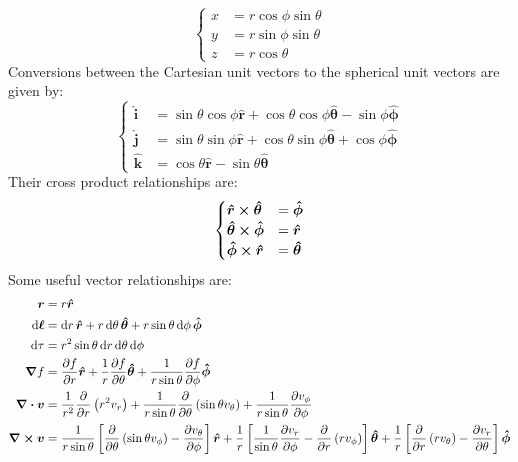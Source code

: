 \documentclass[oneside]{book}
\numberwithin{figure}{section}
\numberwithin{equation}{section}
\newcommand{\paren}[1]{\left(#1\right)}
\newcommand{\bhat}[1]{\bm{\hat{#1}}}
\theoremstyle{definition}
\begin{document}
	\begin{equation}
		\begin{cases}
			x &= r\cos\phi\sin\theta\\
			y &= r\sin\phi\sin\theta\\
			z &= r\cos\theta
		\end{cases}
	\end{equation}
	Conversions between the Cartesian unit vectors to the spherical unit vectors are given by:
	\begin{equation}
		\begin{cases}
			\bhat{i} &= \sin\theta\cos\phi\bhat{r} + \cos\theta\cos\phi\bhat{\theta} - \sin\phi\bhat{\phi}\\
			\bhat{j} &= \sin\theta\sin\phi\bhat{r} + \cos\theta\sin\phi\bhat{\theta} + \cos\phi\bhat{\phi}\\
			\bhat{k} &= \cos\theta\bhat{r} - \sin\theta\bhat{\theta}
		\end{cases}
	\end{equation}
	Their cross product relationships are:
	\begin{equation}
		\begin{cases}
			\bhat{r} \cross \bhat{\theta} &= \bhat{\phi}\\
			\bhat{\theta} \cross \bhat{\phi} &= \bhat{r}\\
			\bhat{\phi} \cross \bhat{r} &= \bhat{\theta}
		\end{cases}
	\end{equation}
	Some useful vector relationships are:
	\begin{align}
		\bm{r} &= r\bhat{r}\\
		\dd{\bm{\ell}} &= \dd{r}\bhat{r} + r\dd{\theta}\bhat{\theta} + r\sin\theta\dd{\phi}\bhat{\phi}\\
		\dd{\tau} &= r^2\sin\theta\dd{r}\dd{\theta}\dd{\phi}\\
		\grad{f} &= \pdv{f}{r}\bhat{r} + \dfrac{1}{r}\pdv{f}{\theta}\bhat{\theta} + \dfrac{1}{r\sin\theta}\pdv{f}{\phi}\bhat{\phi}\\
		\div{\bm{v}} &= \dfrac{1}{r^2}\pdv{r}\paren{r^2v_r} + \dfrac{1}{r\sin\theta}\pdv{\theta}\paren{\sin\theta v_\theta} + \dfrac{1}{r\sin\theta}\pdv{v_\phi}{\phi}\\
		\curl{\bm{v}} &= \dfrac{1}{r\sin\theta}\left[\pdv{\theta}\paren{\sin\theta v_\phi} - \pdv{v_\theta}{\phi}\right]\bhat{r} + \dfrac{1}{r}\left[\dfrac{1}{\sin\theta}\pdv{v_r}{\phi} - \pdv{r}\paren{rv_\phi}\right]\bhat{\theta} + \dfrac{1}{r}\left[\pdv{r}\paren{rv_\theta} - \pdv{v_r}{\theta}\right]\bhat{\phi}
	\end{align}
\end{document}
